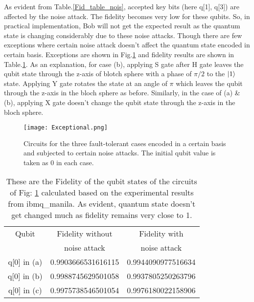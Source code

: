 \documentclass[superscriptaddress,twocolumn,showpacs,prb,floatfix]{revtex4}
\begin{document}
As evident from Table.\ref{Fid_table_nois}, accepted key bits (here q[1], q[3]) are affected by the noise attack. The fidelity becomes very low for these qubits. So, in practical implementation, Bob will not get the expected result as the quantum state is changing considerably due to these noise attacks. Though there are few exceptions where certain noise attack doesn't affect the quantum state encoded in certain basis. Exceptions are shown in Fig.\ref{Exp_noise} and fidelity results are shown in Table.\ref{NoiseExp_tab}. As an explanation, for case (b), applying S gate after H gate leaves the qubit state through the z-axis of blotch sphere\cite{bloch} with a phase of $\pi/2$ to the $\Ket{1}$ state. Applying Y gate rotates the state at an angle of $\pi$ which leaves the qubit through the z-axis in the bloch sphere as before. Similarly, in the case of (a) \& (b), applying X gate doesn't change the qubit state through the z-axis in the bloch sphere. 
\begin{figure}[H]
    \centering
    \texttt{[image: Exceptional.png]}
    \caption{Circuits for the three fault-tolerant cases encoded in a certain basis and subjected to certain noise attacks. The initial qubit value is taken as 0 in each case.}
    \label{Exp_noise}
\end{figure}
\begin{table}[ht]
    \centering
    \begin{tabular}{|c|c|c|}
    \hline
    \hline
    Qubit & Fidelity without & Fidelity with \\ & noise attack & noise attack \\ [0.5ex]
    \hline
     q[0] in (a) & 0.9903666531616115  & 0.9944090977516634 \\ [0.5ex]
    \hline
     q[0] in (b)& 0.9988745629501058  & 0.9937805250263796 \\ [0.5ex]
    \hline
    q[0] in (c) & 0.9975738546501054 & 0.9976180022158906 \\[0.5ex]
    \hline
    \end{tabular}
    \caption{These are the Fidelity of the qubit states of the circuits of Fig:
    \ref{Exp_noise} calculated based on the experimental results from ibmq\_manila. As evident, quantum state doesn't get changed much as fidelity remains very close to 1.}
    \label{NoiseExp_tab}
\end{table}
\end{document}
